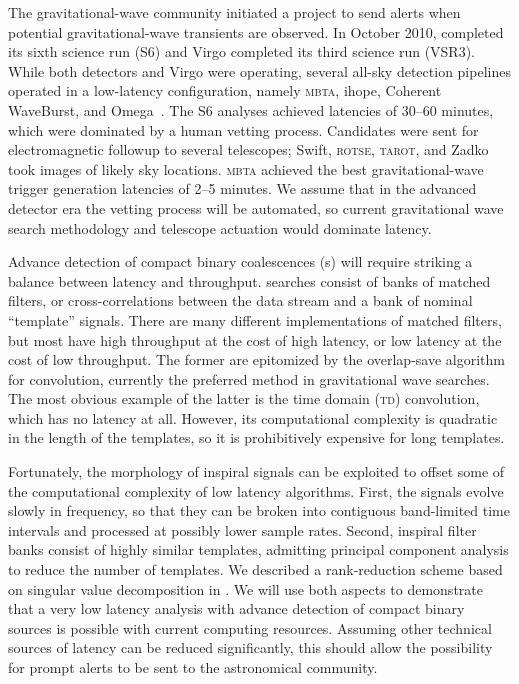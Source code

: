  The gravitational-wave community
initiated a project to send alerts when potential gravitational-wave transients
are observed.  In October 2010, \LIGO{} completed its sixth science run
(S6) and Virgo completed its third science run (VSR3).  While both
\LIGO{} detectors and Virgo were operating, several all-sky detection
pipelines operated in a low-latency configuration, namely \textsc{mbta}, ihope,
Coherent WaveBurst, and Omega~\cite{HugheyGWPAW2011, S6lowlatency}.
 The S6 analyses
achieved latencies of 30--60 minutes, which were dominated by a human vetting
process. Candidates were sent for electromagnetic followup to several
telescopes; Swift, \textsc{rotse}, \textsc{tarot}, and Zadko~\cite{kanner2008,
HugheyGWPAW2011} took images of likely sky locations.  \textsc{mbta} achieved
the best gravitational-wave trigger generation latencies of 2--5 minutes.  We
assume that in the advanced detector era the vetting process will be automated,
so current gravitational wave search methodology and telescope actuation would
dominate latency.

Advance detection of compact binary coalescences (\CBC{}s) will require striking a balance between latency
and throughput.  \CBC{} searches consist of banks of matched filters, or
cross-correlations between the data stream and a bank of nominal ``template''
signals.  There are many different implementations of matched filters, but most
have high throughput at the cost of high latency, or low latency at the cost of
low throughput.  The former are epitomized by the overlap-save algorithm for
\fft{} convolution, currently the preferred method in gravitational wave
searches.  The most obvious example of the latter is the time domain
(\textsc{td}) convolution, which has no latency at all.  However, its
computational complexity is quadratic in the length of the templates, so it is
prohibitively expensive for long templates.

Fortunately, the morphology of inspiral signals can be exploited to offset some
of the computational complexity of low latency algorithms.  First, the signals
evolve slowly in frequency, so that they can be broken into contiguous
band-limited time intervals and processed at possibly lower sample rates.
Second, inspiral filter banks consist of highly similar templates, admitting
principal component analysis to reduce the number of templates.  We described a
rank-reduction scheme based on singular value decomposition in
\cite{Cannon:2010p10398}.  We will use both aspects to demonstrate that a very
low latency analysis with advance detection of compact binary sources is
possible with current computing resources.  Assuming other technical sources of
latency can be reduced significantly, this should allow the possibility for
prompt alerts to be sent to the astronomical community.

